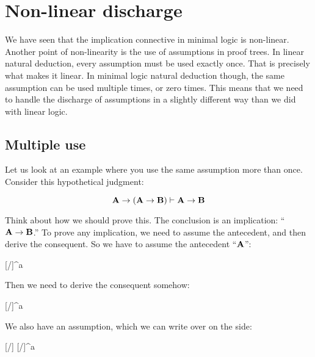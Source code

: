 \documentclass[../../../main.tex]{subfiles}
\begin{document}
\chapter{Non-linear discharge}

We have seen that the implication connective in minimal logic is non-linear. Another point of non-linearity is the use of assumptions in proof trees. In linear natural deduction, every assumption must be used exactly once. That is precisely what makes it linear. In minimal logic natural deduction though, the same assumption can be used multiple times, or zero times. This means that we need to handle the discharge of assumptions in a slightly different way than we did with linear logic. 


\section{Multiple use}

Let us look at an example where you use the same assumption more than once. Consider this hypothetical judgment:

\begin{equation*}
  \nd{A \impl/ (A \impl/ B)} \ndturnstile/ \nd{A \impl/ B}
\end{equation*}

\noindent
Think about how we should prove this. The conclusion is an implication: ``$\nd{A \impl/ B}$.'' To prove any implication, we need to assume the antecedent, and then derive the consequent. So we have to assume the antecedent ``$\mathbf{A}$'':

\begin{prooftree*}
  \hypo{}
  [\startrule/]{^{a}}
\end{prooftree*}

\noindent
Then we need to derive the consequent somehow:

\begin{prooftree*}
  \hypo{}
  [\startrule/]{^{a}}
\end{prooftree*}

\noindent
We also have an assumption, which we can write over on the side:

\begin{prooftree*}
  \hypo{}
  [\startrule/]{}
  \hypo{}
  [\startrule/]{^{a}}
  
\end{prooftree*}
\end{document}
